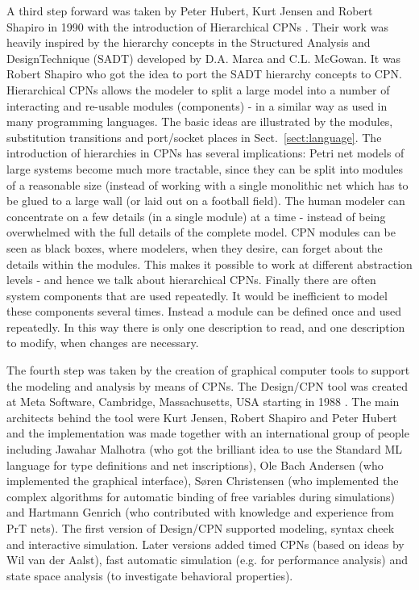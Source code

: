 A third step forward was taken by Peter Hubert, Kurt Jensen and Robert
Shapiro in 1990 with the introduction of Hierarchical CPNs
\cite{huber:91}. Their work was heavily inspired by the hierarchy
concepts in the Structured Analysis and DesignTechnique (SADT)
developed by D.A. Marca and C.L. McGowan. It was Robert Shapiro who
got the idea to port the SADT hierarchy concepts to CPN. Hierarchical
CPNs allows the modeler to split a large model into a number of
interacting and re-usable modules (components) - in a similar way as
used in many programming languages. The basic ideas are illustrated by
the modules, substitution transitions and port/socket places in
Sect.~\ref{sect:language}. The introduction of hierarchies in CPNs has
several implications: Petri net models of large systems become much
more tractable, since they can be split into modules of a reasonable
size (instead of working with a single monolithic net which has to be
glued to a large wall (or laid out on a football field). The human
modeler can concentrate on a few details (in a single module) at a
time - instead of being overwhelmed with the full details of the
complete model. CPN modules can be seen as black boxes, where
modelers, when they desire, can forget about the details within the
modules. This makes it possible to work at different abstraction
levels - and hence we talk about hierarchical CPNs. Finally there are
often system components that are used repeatedly. It would be
inefficient to model these components several times. Instead a module
can be defined once and used repeatedly. In this way there is only one
description to read, and one description to modify, when changes are
necessary.

The fourth step was taken by the creation of graphical computer tools
to support the modeling and analysis by means of CPNs. The Design/CPN
tool was created at Meta Software, Cambridge, Massachusetts, USA
starting in 1988 \cite{jensen:cpnmanual}. The main architects behind
the tool were Kurt Jensen, Robert Shapiro and Peter Hubert and the
implementation was made together with an international group of people
including Jawahar Malhotra (who got the brilliant idea to use the
Standard ML language for type definitions and net inscriptions), Ole
Bach Andersen (who implemented the graphical interface), Søren
Christensen (who implemented the complex algorithms for automatic
binding of free variables during simulations) and Hartmann Genrich
(who contributed with knowledge and experience from PrT nets). The
first version of Design/CPN supported modeling, syntax cheek and
interactive simulation. Later versions added timed CPNs (based on
ideas by Wil van der Aalst), fast automatic simulation (e.g. for
performance analysis) and state space analysis (to investigate
behavioral properties).

